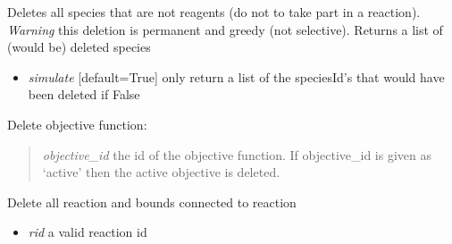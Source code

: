 \documentclass[a4paper,11pt,english]{sphinxmanual}
\begin{document}
\begin{fulllineitems}
\begin{fulllineitems}
\begin{itemize}
\end{itemize}

\end{fulllineitems}


\begin{fulllineitems}
\label{modules_doc:cbmpy.CBModel.Model.deleteNonReactingSpecies}
Deletes all species that are not reagents (do not to take part in a reaction).
\emph{Warning} this deletion is permanent and greedy (not selective). Returns a list of (would be) deleted species
\begin{itemize}
\item {} 
\emph{simulate} {[}default=True{]} only return a list of the speciesId's that would have been deleted if False

\end{itemize}

\end{fulllineitems}


\begin{fulllineitems}
\label{modules_doc:cbmpy.CBModel.Model.deleteObjective}
Delete objective function:
\begin{quote}

\emph{objective\_id} the id of the objective function. If objective\_id is given  as `active' then the active objective is deleted.
\end{quote}

\end{fulllineitems}


\begin{fulllineitems}
\label{modules_doc:cbmpy.CBModel.Model.deleteReactionAndBounds}
Delete all reaction and bounds connected to reaction
\begin{itemize}
\item {} 
\emph{rid} a valid reaction id

\end{itemize}

\end{fulllineitems}


\end{fulllineitems}
\end{document}
